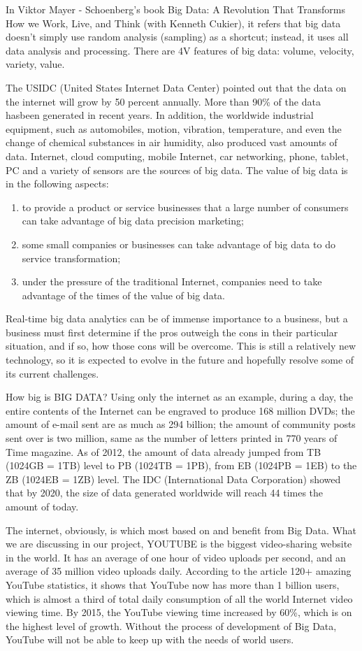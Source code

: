 In Viktor Mayer - Schoenberg's book Big Data: A Revolution That Transforms How we Work, Live, and Think  (with Kenneth Cukier), it refers that big data doesn't simply use random analysis (sampling) as a shortcut; instead, it uses all data analysis and processing. There are 4V features of big data: volume, velocity, variety, value.

The USIDC (United States Internet Data Center) pointed out that the data on the internet will grow by 50 percent annually. More than 90\% of the data hasbeen generated in recent years. In addition, the worldwide industrial equipment, such as automobiles, motion, vibration, temperature, and even the change of chemical substances in air humidity, also produced vast amounts of data. Internet, cloud computing, mobile Internet, car networking, phone, tablet, PC and a variety of sensors are the sources of big data. The value of big data is in the following aspects:

\begin{enumerate}
  \item to provide a product or service businesses that a large number of consumers can take advantage of big data precision marketing;
  \item some small companies or businesses can take advantage of big data to do service transformation;
  \item under the pressure of the traditional Internet, companies need to take advantage of the times of the value of big data.
\end{enumerate}

Real-time big data analytics can be of immense importance to a business, but a business must first determine if the pros outweigh the cons in their particular situation, and if so, how those cons will be overcome. This is still a relatively new technology, so it is expected to evolve in the future and hopefully resolve some of its current challenges.

How big is BIG DATA? Using only the internet as an example, during a day, the entire contents of the Internet can be engraved to produce 168 million DVDs; the amount of e-mail sent are as much as 294 billion; the amount of community posts sent over is two million, same as the number of letters printed in 770 years of Time magazine. As of 2012, the amount of data already jumped from TB (1024GB = 1TB) level to PB (1024TB = 1PB), from EB (1024PB = 1EB) to the ZB (1024EB = 1ZB) level. The IDC (International Data Corporation) showed that by 2020, the size of data generated worldwide will reach 44 times the amount of today.

The internet, obviously, is which most based on and benefit from Big Data. What we are discussing in our project, YOUTUBE is the biggest video-sharing website in the world. It has an average of one hour of video uploads per second, and an average of 35 million video uploads daily. According to the article 120+ amazing YouTube statistics, it shows that YouTube now has more than 1 billion users, which is almost a third of total daily consumption of all the world Internet video viewing time. By 2015, the YouTube viewing time increased by 60\%, which is on the highest level of growth. Without the process of development of Big Data, YouTube will not be able to keep up with the needs of world users.
